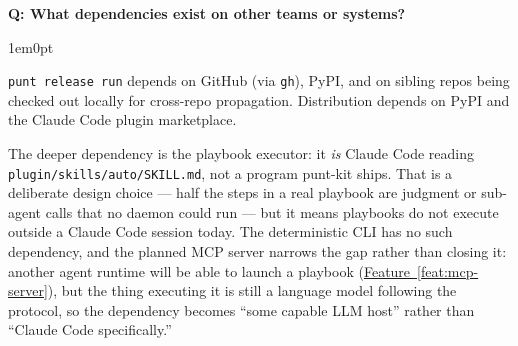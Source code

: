 \documentclass[11pt,letterpaper]{article}
\newcounter{faqnum}
\newenvironment{faqpair}[1]{%
  \needspace{4\baselineskip}%
  \vspace{0.5em}%
  \refstepcounter{faqnum}%
  \noindent\textbf{\color{SectionBlue}Q\thefaqnum: #1}\par\nopagebreak[4]%
  \vspace{0.2em}%
  \begin{adjustwidth}{1em}{0pt}%
  \setlength{\parindent}{0pt}%
}{%
  \end{adjustwidth}%
  \vspace{0.5em}%
}
\newcommand{\featureref}[1]{\hyperref[#1]{Feature~\ref*{#1}}}
\begin{document}
\begin{faqpair}{What dependencies exist on other teams or systems?}
  \texttt{punt release run} depends on GitHub (via \texttt{gh}), PyPI, and on
  sibling repos being checked out locally for cross-repo propagation.
  Distribution depends on PyPI and the Claude Code plugin marketplace.

  The deeper dependency is the playbook executor: it \emph{is} Claude Code
  reading \texttt{plugin/skills/auto/SKILL.md}, not a program punt-kit ships. That is
  a deliberate design choice --- half the steps in a real playbook are judgment
  or sub-agent calls that no daemon could run --- but it means playbooks do not
  execute outside a Claude Code session today. The deterministic CLI has no
  such dependency, and the planned MCP server narrows the gap rather than
  closing it: another agent runtime will be able to launch a playbook
  (\featureref{feat:mcp-server}), but the thing executing it is still a
  language model following the protocol, so the dependency becomes ``some
  capable LLM host'' rather than ``Claude Code specifically.''
\end{faqpair}
\end{document}

